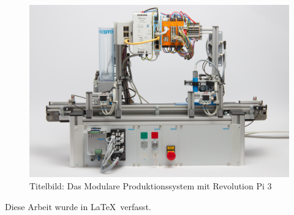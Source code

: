 \thispagestyle{empty}
\vfill
\begin{figure}[h]
    \centering
    \includegraphics[width=\textwidth]{../photos/serverless_plc_img_3}
    Titelbild: Das Modulare Produktionssystem mit Revolution Pi 3
    \label{fig:title}
\end{figure}
\vfill
Diese Arbeit wurde in \LaTeX\  verfasst.\\

